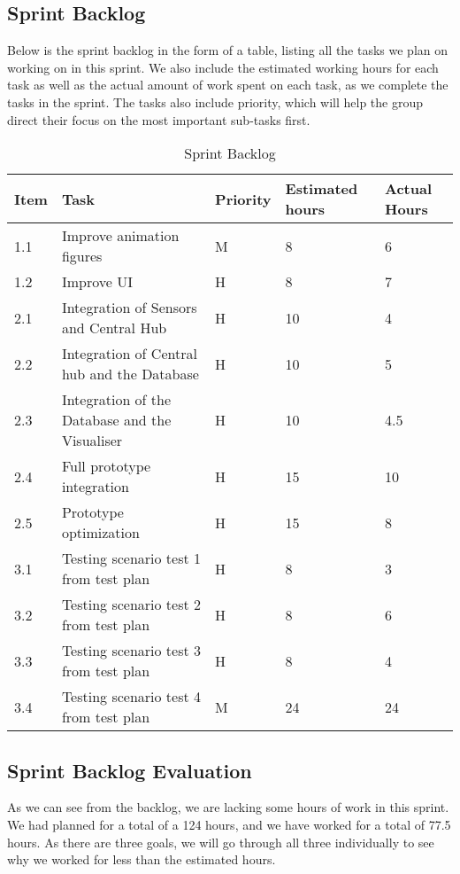 \documentclass[../document]{subfiles}
\begin{document}
\subsection{Sprint Backlog}

Below is the sprint backlog in the form of a table, listing all the tasks we plan on working on in this sprint. We also include the estimated working hours for each task as well as the actual amount of work spent on each task, as we complete the tasks in the sprint. The tasks also include priority, which will help the group direct their focus on the most important sub-tasks first.

\begin{table}[H]
\caption{Sprint Backlog}
\centering
\begin{tabularx}{\textwidth}{|l|X|l|l|l|}
\hline
	Item
	&Task
	&Priority
	&Estimated hours
	&Actual Hours
	\\ \hline 1.1
	&Improve animation figures
	&M
	&8
	&6
	\\ \hline 1.2
	&Improve UI
	&H
	&8
	&7
	\\ \hline 2.1
	&Integration of Sensors and Central Hub
	&H
	&10
	&4
	\\ \hline 2.2
	&Integration of Central hub and the Database
	&H
	&10
	&5
	\\ \hline 2.3
	&Integration of the Database and the Visualiser
	&H
	&10
	&4.5
	\\ \hline 2.4
	&Full prototype integration
	&H
	&15
	&10
	\\ \hline 2.5
	&Prototype optimization
	&H
	&15
	&8
	\\ \hline 3.1
	&Testing scenario test 1 from test plan
	&H
	&8
	&3
	\\ \hline 3.2
	&Testing scenario test 2 from test plan
	&H
	&8
	&6
	\\ \hline 3.3
	&Testing scenario test 3 from test plan
	&H
	&8
	&4
	\\ \hline 3.4
	&Testing scenario test 4 from test plan
	&M
	&24\footnotemark[1]
	&24
	\\ \hline 
\end{tabularx}
\end{table}


\subsection{Sprint Backlog Evaluation}
As we can see from the backlog, we are lacking some hours of work in this sprint. We had planned for a total of a 124 hours, and we have worked for a total of 77.5 hours. As there are three goals, we will go through all three individually to see why we worked for less than the estimated hours.
\end{document}
